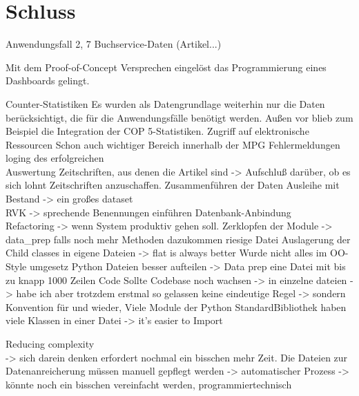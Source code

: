 
\chapter{Schluss}
\label{chap:six}

Anwendungsfall 2, 7
Buchservice-Daten (Artikel...)


Mit dem Proof-of-Concept Versprechen eingelöst das Programmierung eines Dashboards gelingt.

Counter-Statistiken
Es wurden als Datengrundlage weiterhin nur die Daten berücksichtigt, 
die für die Anwendungsfälle benötigt werden. Außen vor blieb zum Beispiel die Integration der \acrshort{COP 5}-Statistiken.
Zugriff auf elektronische Ressourcen Schon auch wichtiger Bereich innerhalb der MPG
Fehlermeldungen loging des erfolgreichen
\\
Auswertung Zeitschriften, aus denen die Artikel sind -> Aufschluß darüber, ob es sich lohnt Zeitschriften anzuschaffen.
Zusammenführen der Daten Ausleihe mit Bestand -> ein großes dataset
\\
 RVK -> sprechende Benennungen einführen
 Datenbank-Anbindung
\\
Refactoring -> wenn System produktiv gehen soll.
Zerklopfen der Module -> data\_prep falls noch mehr Methoden dazukommen  riesige Datei Auslagerung der Child classes in eigene Dateien
-> flat is always better
Wurde nicht alles im OO-Style umgesetz
Python Dateien besser aufteilen -> Data prep eine Datei mit bis zu knapp 1000 Zeilen Code
    Sollte Codebase noch wachsen -> in einzelne dateien - > habe ich aber trotzdem erstmal so gelassen
    keine eindeutige Regel -> sondern Konvention für und wieder, Viele Module der Python StandardBibliothek
    haben viele Klassen in einer Datei -> it's easier to Import

Reducing complexity \cite[Vgl.][]{ousterhout_philosophy_2018}
\\
-> sich darein denken erfordert nochmal ein bisschen mehr Zeit.
Die Dateien zur Datenanreicherung müssen manuell gepflegt werden -> automatischer Prozess -> könnte noch ein bisschen vereinfacht werden,
programmiertechnisch

